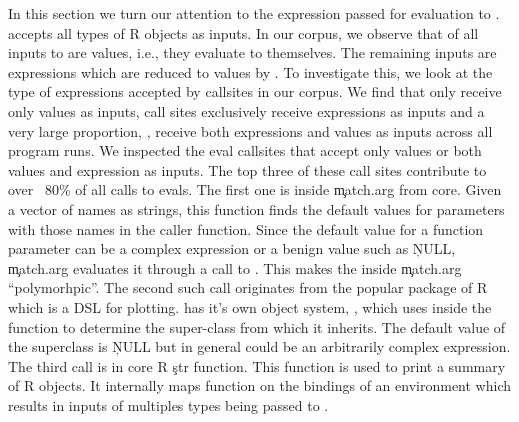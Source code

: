 \documentclass[conference]{IEEEtran}
\begin{document}
In this section we turn our attention to the expression passed for evaluation to
\eval. \eval accepts all types of R objects as inputs. In our corpus, we observe
that \AllValueInputEvalCallPerc of all inputs to \eval are values, i.e., they evaluate to
themselves. The remaining \AllExpressionInputEvalCallPerc inputs are expressions
which are reduced to values by \eval.
To investigate this, we look at the type of expressions accepted by \eval
callsites in our corpus. We find that only \AllValueInputEvalSitePerc receive
only values as inputs, \AllExpressionInputEvalSitePerc call
sites exclusively receive expressions as inputs and a very large proportion,
\AllPolymorphicInputEvalSitePerc, receive both expressions and values as inputs across all program runs.
We inspected the eval callsites that accept only values or both values and expression as inputs.
The top three of these call sites contribute to over
~80\% of all calls to evals. The first one is inside \c{match.arg} from core.
Given a vector of names as strings, this function finds the default values for
parameters with those names in the caller function. Since the default value for
a function parameter can be a complex expression or a benign value such as
\c{NULL}, \c{match.arg} evaluates it through a call to \eval. This makes the
\eval inside \c{match.arg} ``polymorhpic''. The second such \eval call
originates from the popular \ggplot package of R which is a DSL for plotting.
\ggplot has it's own object system, \ggproto, which uses \eval inside the
\ggproto function to determine the super-class from which it inherits. The
default value of the superclass is \c{NULL} but in general could be an
arbitrarily complex expression. The third \eval call is in core R \c{str}
function. This function is used to print a summary of R objects. It internally
maps \eval function on the bindings of an environment which results in inputs of
multiples types being passed to \eval.


\end{document}
